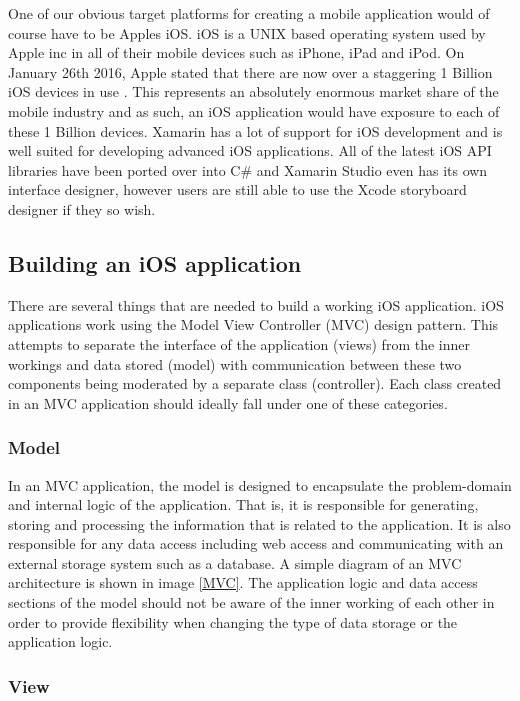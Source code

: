 \documentclass[main.tex]{subfiles}
\begin{document}
One of our obvious target platforms for creating a mobile application would of course have to be Apples iOS. iOS is a UNIX based operating system used by Apple inc in all of their mobile devices such as iPhone, iPad and iPod. On January 26th 2016, Apple stated that there are now over a staggering 1 Billion iOS devices in use \cite{1billios}. This represents an absolutely enormous market share of the mobile industry and as such, an iOS application would have exposure to each of these 1 Billion devices. Xamarin has a lot of support for iOS development and is well suited for developing advanced iOS applications. All of the latest iOS API libraries have been ported over into C# and Xamarin Studio even has its own interface designer, however users are still able to use the Xcode storyboard designer if they so wish.

\subsection{Building an iOS application}

There are several things that are needed to build a working iOS application. iOS applications work using the Model View Controller (MVC) design pattern. This attempts to separate the interface of the application (views) from the inner workings and data stored (model) with communication between these two components being moderated by a separate class (controller). Each class created in an MVC application should ideally fall under one of these categories. 

\subsubsection{Model}

In an MVC application, the model is designed to encapsulate the problem-domain and internal logic of the application. That is, it is responsible for generating, storing and processing the information that is related to the application. It is also responsible for any data access including web access and communicating with an external storage system such as a database. A simple diagram of an MVC architecture is shown in image \ref{MVC}. The application logic and data access sections of the model should not be aware of the inner working of each other in order to provide flexibility when changing the type of data storage or the application logic. 

\subsubsection{View}
\end{document}
